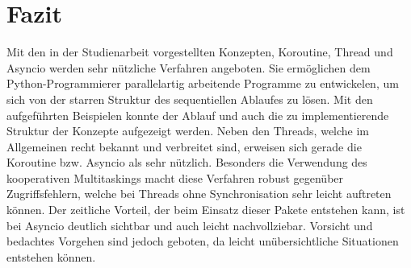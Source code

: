 \chapter{Fazit}\label{ch:fazit}
Mit den in der Studienarbeit vorgestellten Konzepten, Koroutine, Thread und Asyncio werden sehr nützliche Verfahren angeboten. Sie ermöglichen dem Python-Programmierer parallelartig arbeitende Programme zu entwickelen, um sich von der starren Struktur des sequentiellen Ablaufes zu lösen.
Mit den aufgeführten Beispielen konnte der Ablauf und auch die zu implementierende Struktur der Konzepte aufgezeigt werden. Neben den Threads, welche im Allgemeinen recht bekannt und verbreitet sind, erweisen sich gerade die Koroutine bzw. Asyncio als sehr nützlich. 
Besonders die Verwendung des kooperativen Multitaskings macht diese Verfahren robust gegenüber Zugriffsfehlern, welche bei Threads ohne Synchronisation sehr leicht auftreten können. 
Der zeitliche Vorteil, der beim Einsatz dieser Pakete entstehen kann, ist bei Asyncio deutlich sichtbar und auch leicht nachvollziebar. Vorsicht und bedachtes Vorgehen sind jedoch geboten, da leicht unübersichtliche Situationen entstehen können.

